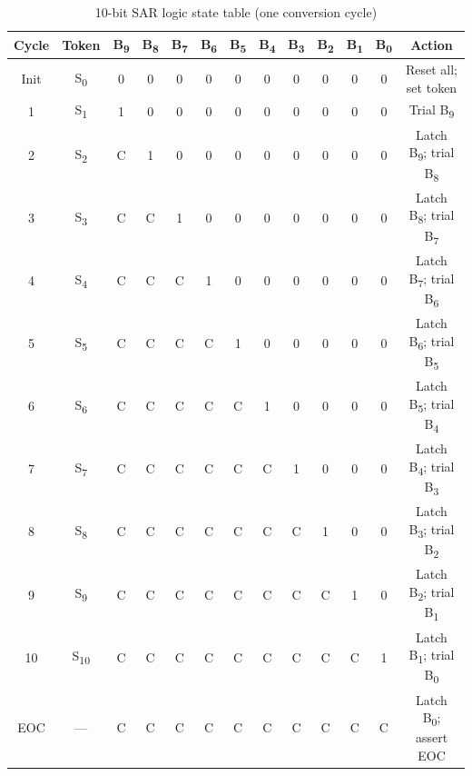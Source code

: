 \begin{table}[h!]
	\centering
	\caption{10-bit SAR logic state table (one conversion cycle)}
	\label{tab:sar_state}
	\renewcommand{\arraystretch}{1.3}
	
	\begin{tabular}{ccccccccccccc}
		\toprule
		\textbf{Cycle} &
		\textbf{Token} &
		\textbf{B\textsubscript{9}} &
		\textbf{B\textsubscript{8}} &
		\textbf{B\textsubscript{7}} &
		\textbf{B\textsubscript{6}} &
		\textbf{B\textsubscript{5}} &
		\textbf{B\textsubscript{4}} &
		\textbf{B\textsubscript{3}} &
		\textbf{B\textsubscript{2}} &
		\textbf{B\textsubscript{1}} &
		\textbf{B\textsubscript{0}} &
		\textbf{Action} \\
		\midrule
		Init & S\textsubscript{0} & 0 & 0 & 0 & 0 & 0 & 0 & 0 & 0 & 0 & 0 & Reset all; set token \\
		1    & S\textsubscript{1} & 1 & 0 & 0 & 0 & 0 & 0 & 0 & 0 & 0 & 0 & Trial B\textsubscript{9} \\
		2    & S\textsubscript{2} & C & 1 & 0 & 0 & 0 & 0 & 0 & 0 & 0 & 0 & Latch B\textsubscript{9}; trial B\textsubscript{8} \\
		3    & S\textsubscript{3} & C & C & 1 & 0 & 0 & 0 & 0 & 0 & 0 & 0 & Latch B\textsubscript{8}; trial B\textsubscript{7} \\
		4    & S\textsubscript{4} & C & C & C & 1 & 0 & 0 & 0 & 0 & 0 & 0 & Latch B\textsubscript{7}; trial B\textsubscript{6} \\
		5    & S\textsubscript{5} & C & C & C & C & 1 & 0 & 0 & 0 & 0 & 0 & Latch B\textsubscript{6}; trial B\textsubscript{5} \\
		6    & S\textsubscript{6} & C & C & C & C & C & 1 & 0 & 0 & 0 & 0 & Latch B\textsubscript{5}; trial B\textsubscript{4} \\
		7    & S\textsubscript{7} & C & C & C & C & C & C & 1 & 0 & 0 & 0 & Latch B\textsubscript{4}; trial B\textsubscript{3} \\
		8    & S\textsubscript{8} & C & C & C & C & C & C & C & 1 & 0 & 0 & Latch B\textsubscript{3}; trial B\textsubscript{2} \\
		9    & S\textsubscript{9} & C & C & C & C & C & C & C & C & 1 & 0 & Latch B\textsubscript{2}; trial B\textsubscript{1} \\
		10   & S\textsubscript{10}& C & C & C & C & C & C & C & C & C & 1 & Latch B\textsubscript{1}; trial B\textsubscript{0} \\
		EOC  & ---               & C & C & C & C & C & C & C & C & C & C & Latch B\textsubscript{0}; assert EOC \\
		\bottomrule
	\end{tabular}
\end{table}


